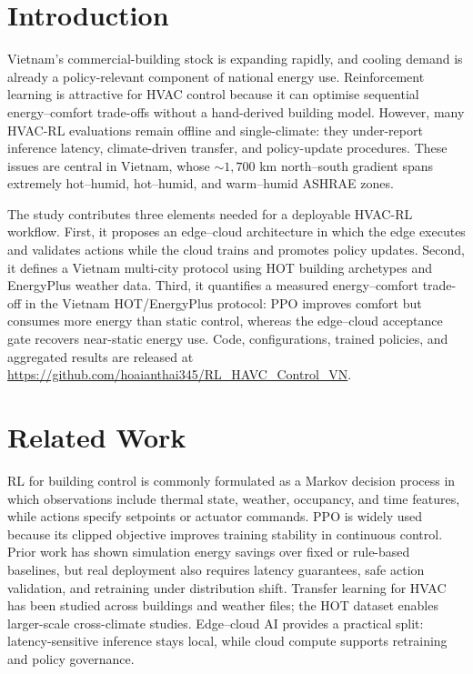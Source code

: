 \documentclass[runningheads,a4paper]{llncs}
\begin{document}
\section{Introduction}
Vietnam's commercial-building stock is expanding rapidly, and cooling demand is already a policy-relevant component of national energy use. Reinforcement learning is attractive for HVAC control because it can optimise sequential energy--comfort trade-offs without a hand-derived building model\cite{vazquez2019rl,wang2020review}. However, many HVAC-RL evaluations remain offline and single-climate: they under-report inference latency, climate-driven transfer, and policy-update procedures. These issues are central in Vietnam, whose $\sim 1{,}700$ km north--south gradient spans extremely hot--humid, hot--humid, and warm--humid ASHRAE zones.

The study contributes three elements needed for a deployable HVAC-RL workflow. First, it proposes an edge--cloud architecture in which the edge executes and validates actions while the cloud trains and promotes policy updates. Second, it defines a Vietnam multi-city protocol using HOT building archetypes\cite{berkes2025hot} and EnergyPlus weather data\cite{doe2024epw}. Third, it quantifies a measured energy--comfort trade-off in the Vietnam HOT/EnergyPlus protocol: PPO improves comfort but consumes more energy than static control, whereas the edge--cloud acceptance gate recovers near-static energy use. Code, configurations, trained policies, and aggregated results are released at \url{https://github.com/hoaianthai345/RL_HAVC_Control_VN}.

\section{Related Work}
RL for building control is commonly formulated as a Markov decision process in which observations include thermal state, weather, occupancy, and time features, while actions specify setpoints or actuator commands\cite{vazquez2019rl}. PPO is widely used because its clipped objective improves training stability in continuous control\cite{schulman2017ppo}. Prior work has shown simulation energy savings over fixed or rule-based baselines\allowbreak\cite{zhang2019whole,yu2021review}, but real deployment also requires latency guarantees, safe action validation, and retraining under distribution shift\cite{dulac2021challenges}. Transfer learning for HVAC has been studied across buildings and weather files\cite{fang2023transfer,kadamala2024transfer}; the HOT dataset enables larger-scale cross-climate studies\cite{berkes2025hot}. Edge--cloud AI provides a practical split: latency-sensitive inference stays local, while cloud compute supports retraining and policy governance\cite{shi2016edge,li2023edgeai}.
\end{document}
